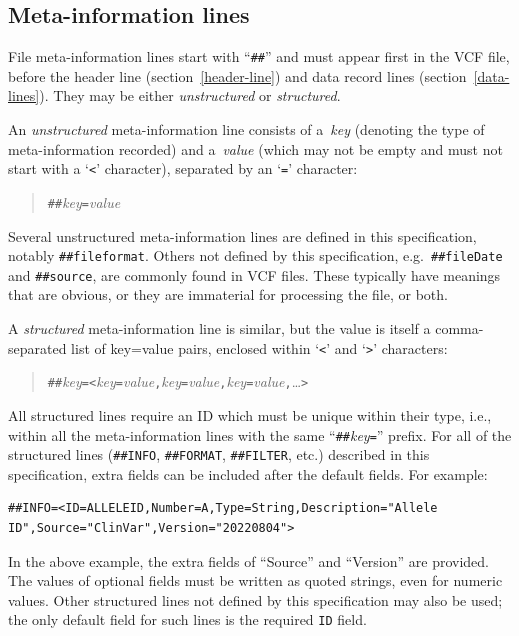 \documentclass[8pt]{article}
\begin{document}
\subsection{Meta-information lines}
File meta-information lines start with ``\verb|##|'' and must appear first in the VCF file, before the header line (section~\ref{header-line}) and data record lines (section~\ref{data-lines}).
They may be either \emph{unstructured} or \emph{structured}.

An \emph{unstructured} meta-information line consists of a~\emph{key} (denoting the type of meta-information recorded) and a~\emph{value} (which may not be empty and must not start with a `\verb|<|' character), separated by an `\verb|=|' character:
\begin{quote}
\verb|##|\emph{key}\verb|=|\emph{value}
\end{quote}
Several unstructured meta-information lines are defined in this specification, notably \verb|##fileformat|.
Others not defined by this specification, e.g.\ \verb|##fileDate| and \verb|##source|, are commonly found in VCF files.
These typically have meanings that are obvious, or they are immaterial for processing the file, or both.

A \emph{structured} meta-information line is similar, but the value is itself a comma-separated list of key=value pairs, enclosed within `\verb|<|' and `\verb|>|' characters:
\begin{quote}
\verb|##|\emph{key}\verb|=<|\emph{key}\verb|=|\emph{value}\verb|,|\emph{key}\verb|=|\emph{value}\verb|,|\emph{key}\verb|=|\emph{value}\verb|,|\ldots\verb|>|
\end{quote}
All structured lines require an ID which must be unique within their type, i.e., within all the meta-information lines with the same ``\verb|##|\emph{key}\verb|=|'' prefix.
For all of the structured lines (\verb|##INFO|, \verb|##FORMAT|, \verb|##FILTER|, etc.) described in this specification, extra fields can be included after the default fields.
For example:
\begin{verbatim}
##INFO=<ID=ALLELEID,Number=A,Type=String,Description="Allele ID",Source="ClinVar",Version="20220804">
\end{verbatim}
In the above example, the extra fields of ``Source'' and ``Version'' are provided.
The values of optional fields must be written as quoted strings, even for numeric values.
Other structured lines not defined by this specification may also be used; the only default field for such lines is the required \verb|ID| field.
\end{document}
